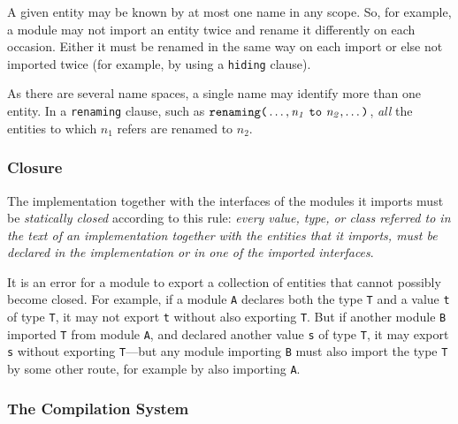 A given entity may be known by at most one name in any scope.
So, for example, a module may not import an entity twice and rename it
differently on each occasion.  Either it must be renamed in the same
way on each import or else not imported twice (for example, by using
a \mbox{\tt hiding} clause).

As there are several name spaces, a single name may identify 
more than one entity. In a \mbox{\tt renaming} clause, such as 
\mbox{$\it \makebox{\tt renaming(}\ldots ,n_1\ \makebox{\tt to}\ n_2,\ldots \makebox{\tt )}$}, {\em all} the entities to
which $n_1$ refers are renamed to $n_2$.

\subsubsection{Closure}
\label{closure}

The implementation together with the interfaces of
the modules it imports must be {\em statically closed} according to
this rule: {\em every value, type, or class referred to
in the text of 
an implementation together with the
entities that it imports, must be 
declared in the implementation or in one of the
imported interfaces}.

It is an error for a module to export a collection of entities that
cannot possibly become closed.  For example, if a module \mbox{\tt A} declares
both the type \mbox{\tt T} and a value \mbox{\tt t} of type \mbox{\tt T}, it may not export \mbox{\tt t}
without also exporting \mbox{\tt T}.  But if
another module \mbox{\tt B} imported \mbox{\tt T}
from module \mbox{\tt A}, and declared another value \mbox{\tt s} of type \mbox{\tt T}, it may
export \mbox{\tt s} without exporting \mbox{\tt T}---but any module importing \mbox{\tt B} must
also import the type \mbox{\tt T} by some other route, for example by also
importing \mbox{\tt A}.

%
\subsubsection{The Compilation System}


